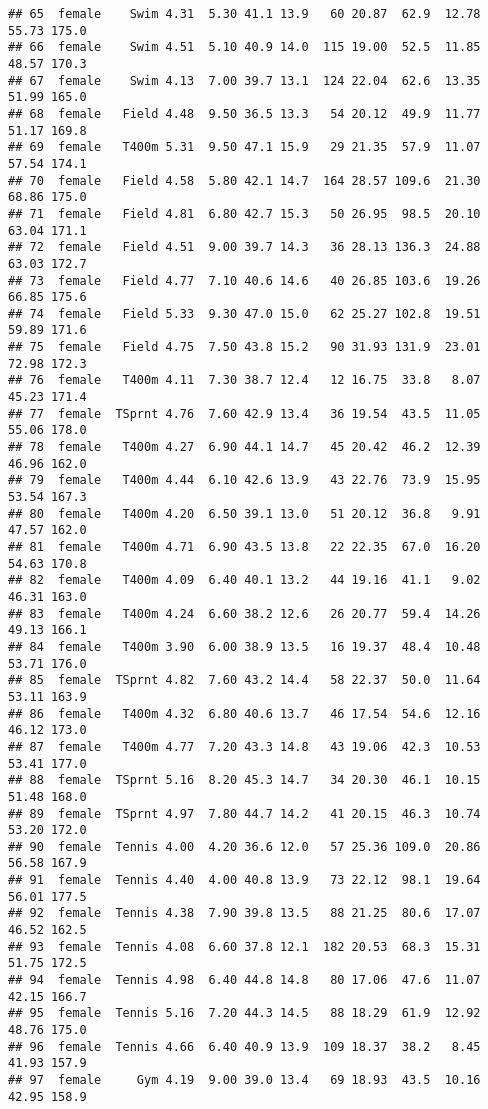 \documentclass[
]{article}
\begin{document}
\begin{verbatim}
## 65  female    Swim 4.31  5.30 41.1 13.9   60 20.87  62.9  12.78  55.73 175.0
## 66  female    Swim 4.51  5.10 40.9 14.0  115 19.00  52.5  11.85  48.57 170.3
## 67  female    Swim 4.13  7.00 39.7 13.1  124 22.04  62.6  13.35  51.99 165.0
## 68  female   Field 4.48  9.50 36.5 13.3   54 20.12  49.9  11.77  51.17 169.8
## 69  female   T400m 5.31  9.50 47.1 15.9   29 21.35  57.9  11.07  57.54 174.1
## 70  female   Field 4.58  5.80 42.1 14.7  164 28.57 109.6  21.30  68.86 175.0
## 71  female   Field 4.81  6.80 42.7 15.3   50 26.95  98.5  20.10  63.04 171.1
## 72  female   Field 4.51  9.00 39.7 14.3   36 28.13 136.3  24.88  63.03 172.7
## 73  female   Field 4.77  7.10 40.6 14.6   40 26.85 103.6  19.26  66.85 175.6
## 74  female   Field 5.33  9.30 47.0 15.0   62 25.27 102.8  19.51  59.89 171.6
## 75  female   Field 4.75  7.50 43.8 15.2   90 31.93 131.9  23.01  72.98 172.3
## 76  female   T400m 4.11  7.30 38.7 12.4   12 16.75  33.8   8.07  45.23 171.4
## 77  female  TSprnt 4.76  7.60 42.9 13.4   36 19.54  43.5  11.05  55.06 178.0
## 78  female   T400m 4.27  6.90 44.1 14.7   45 20.42  46.2  12.39  46.96 162.0
## 79  female   T400m 4.44  6.10 42.6 13.9   43 22.76  73.9  15.95  53.54 167.3
## 80  female   T400m 4.20  6.50 39.1 13.0   51 20.12  36.8   9.91  47.57 162.0
## 81  female   T400m 4.71  6.90 43.5 13.8   22 22.35  67.0  16.20  54.63 170.8
## 82  female   T400m 4.09  6.40 40.1 13.2   44 19.16  41.1   9.02  46.31 163.0
## 83  female   T400m 4.24  6.60 38.2 12.6   26 20.77  59.4  14.26  49.13 166.1
## 84  female   T400m 3.90  6.00 38.9 13.5   16 19.37  48.4  10.48  53.71 176.0
## 85  female  TSprnt 4.82  7.60 43.2 14.4   58 22.37  50.0  11.64  53.11 163.9
## 86  female   T400m 4.32  6.80 40.6 13.7   46 17.54  54.6  12.16  46.12 173.0
## 87  female   T400m 4.77  7.20 43.3 14.8   43 19.06  42.3  10.53  53.41 177.0
## 88  female  TSprnt 5.16  8.20 45.3 14.7   34 20.30  46.1  10.15  51.48 168.0
## 89  female  TSprnt 4.97  7.80 44.7 14.2   41 20.15  46.3  10.74  53.20 172.0
## 90  female  Tennis 4.00  4.20 36.6 12.0   57 25.36 109.0  20.86  56.58 167.9
## 91  female  Tennis 4.40  4.00 40.8 13.9   73 22.12  98.1  19.64  56.01 177.5
## 92  female  Tennis 4.38  7.90 39.8 13.5   88 21.25  80.6  17.07  46.52 162.5
## 93  female  Tennis 4.08  6.60 37.8 12.1  182 20.53  68.3  15.31  51.75 172.5
## 94  female  Tennis 4.98  6.40 44.8 14.8   80 17.06  47.6  11.07  42.15 166.7
## 95  female  Tennis 5.16  7.20 44.3 14.5   88 18.29  61.9  12.92  48.76 175.0
## 96  female  Tennis 4.66  6.40 40.9 13.9  109 18.37  38.2   8.45  41.93 157.9
## 97  female     Gym 4.19  9.00 39.0 13.4   69 18.93  43.5  10.16  42.95 158.9

\end{verbatim}
\end{document}
